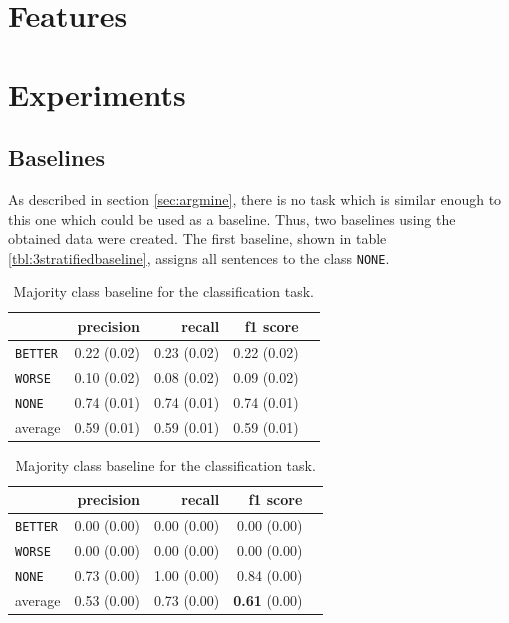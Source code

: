 \section{Features}


\section{Experiments}
\subsection{Baselines}
\label{sec:3_baseline}
As described in section \ref{sec:argmine}, there is no task which is similar enough to this one which could be used as a baseline. Thus, two baselines using the obtained data were created. The first baseline, shown in table \ref{tbl:3stratifiedbaseline}, assigns all sentences to the class \texttt{NONE}.

\begin{table}[!htb]
    \begin{minipage}{.5\linewidth}
      \caption{Random (stratified) baseline for the classification task.}
      \label{tbl:3stratifiedbaseline}
      \centering
      
\begin{tabular}{@{}lrrrr@{}}
\toprule
 	&	 precision &	 recall &	 f1 score  \\ \midrule 
\texttt{BETTER}	&	 0.22 \scriptsize{(0.02)} &	 0.23 \scriptsize{(0.02)} &	 0.22 \scriptsize{(0.02)}  \\ 
\texttt{WORSE}	&	 0.10 \scriptsize{(0.02)} &	 0.08 \scriptsize{(0.02)} &	 0.09 \scriptsize{(0.02)}  \\ 
\texttt{NONE}	&	 0.74 \scriptsize{(0.01)} &	 0.74 \scriptsize{(0.01)} &	 0.74 \scriptsize{(0.01)}  \\ 
average	&	 0.59 \scriptsize{(0.01)} &	 0.59 \scriptsize{(0.01)} &	 0.59 \scriptsize{(0.01)}  \\ 
\bottomrule
\end{tabular} 

  \end{minipage}%
    \begin{minipage}{.5\linewidth}
      \centering
        \caption{Majority class baseline for the classification task.}
        \label{tbl:3majoritybaseline}
\begin{tabular}{@{}lrrrr@{}}
\toprule
 	&	 precision &	 recall &	 f1 score  \\ \midrule 
\texttt{BETTER}	&	 0.00 \scriptsize{(0.00)} &	 0.00 \scriptsize{(0.00)} &	 0.00 \scriptsize{(0.00)}  \\ 
\texttt{WORSE}	&	 0.00 \scriptsize{(0.00)} &	 0.00 \scriptsize{(0.00)} &	 0.00 \scriptsize{(0.00)}  \\ 
\texttt{NONE}	&	 0.73 \scriptsize{(0.00)} &	 1.00 \scriptsize{(0.00)} &	 0.84 \scriptsize{(0.00)}  \\ 
average	&	 0.53 \scriptsize{(0.00)} &	 0.73 \scriptsize{(0.00)} &	 \textbf{0.61} \scriptsize{(0.00)}  \\ 
\bottomrule
\end{tabular}
    \end{minipage} 
\end{table}



